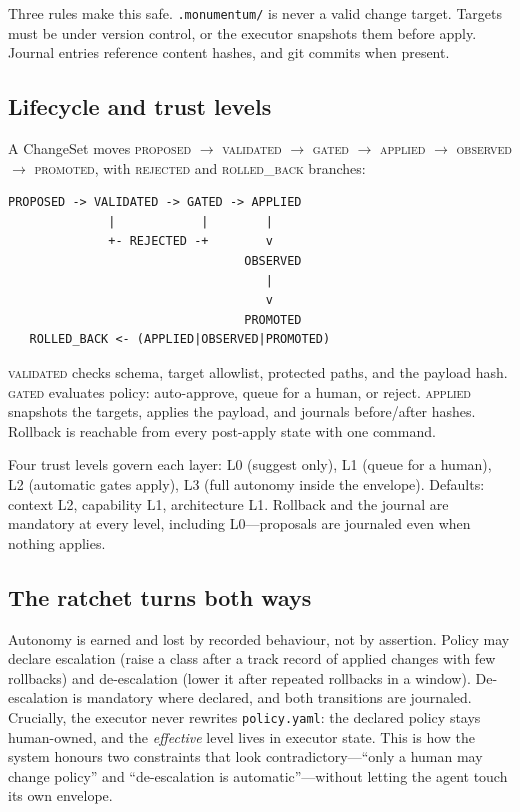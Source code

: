 \documentclass[10pt,twocolumn]{article}
\begin{document}
Three rules make this safe. \texttt{.monumentum/} is never a valid change target.
Targets must be under version control, or the executor snapshots them
before apply. Journal entries reference content hashes, and git commits
when present.

\subsection{Lifecycle and trust levels}
A ChangeSet moves \textsc{proposed} $\rightarrow$ \textsc{validated}
$\rightarrow$ \textsc{gated} $\rightarrow$ \textsc{applied}
$\rightarrow$ \textsc{observed} $\rightarrow$ \textsc{promoted}, with
\textsc{rejected} and \textsc{rolled\_back} branches:

\begin{verbatim}
PROPOSED -> VALIDATED -> GATED -> APPLIED
              |            |        |
              +- REJECTED -+        v
                                 OBSERVED
                                    |
                                    v
                                 PROMOTED
   ROLLED_BACK <- (APPLIED|OBSERVED|PROMOTED)
\end{verbatim}

\textsc{validated} checks schema, target allowlist, protected paths, and
the payload hash. \textsc{gated} evaluates policy: auto-approve, queue for
a human, or reject. \textsc{applied} snapshots the targets, applies the
payload, and journals before/after hashes. Rollback is reachable from
every post-apply state with one command.

Four trust levels govern each layer: L0 (suggest only), L1 (queue for a
human), L2 (automatic gates apply), L3 (full autonomy inside the
envelope). Defaults: context L2, capability L1, architecture L1. Rollback
and the journal are mandatory at every level, including L0---proposals are
journaled even when nothing applies.

\subsection{The ratchet turns both ways}
Autonomy is earned and lost by recorded behaviour, not by assertion.
Policy may declare escalation (raise a class after a track record of
applied changes with few rollbacks) and de-escalation (lower it after
repeated rollbacks in a window). De-escalation is mandatory where declared,
and both transitions are journaled. Crucially, the executor never rewrites
\texttt{policy.yaml}: the declared policy stays human-owned, and the
\emph{effective} level lives in executor state. This is how the system
honours two constraints that look contradictory---``only a human may change
policy'' and ``de-escalation is automatic''---without letting the agent
touch its own envelope.
\end{document}
